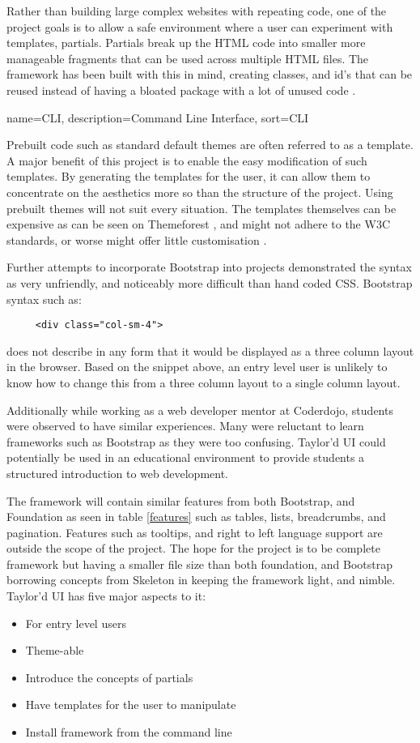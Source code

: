 Rather than building large complex websites with repeating code, one of the project goals is to allow a safe environment where a user can experiment with templates, partials. Partials break up the \gls{HTML} code into smaller more manageable fragments that can be used across multiple \gls{HTML} files. The framework has been built with this in mind, creating classes, and id's that can be reused instead of having a bloated package with a lot of unused code \citep{KAR15}.

{
  name={CLI},
  description={Command Line Interface},
  sort=CLI
}

Prebuilt code such as standard default themes are often referred to as a template. A major benefit of this project is to enable the easy modification of such templates. By generating the templates for the user, it can allow them to concentrate on the aesthetics more so than the structure of the project. Using prebuilt themes will not suit every situation. The templates themselves can be expensive as can be seen on Themeforest \citep{THEME17}, and might not adhere to the W3C standards, or worse might offer little customisation \citep{NATH16}. 

Further attempts to incorporate Bootstrap into projects demonstrated the syntax as very unfriendly, and noticeably more difficult than hand coded \gls{CSS}. Bootstrap syntax such as: \begin{lstlisting}
	 <div class="col-sm-4">\end{lstlisting} 
	 does not describe in any form that it would be displayed as a three column layout in the browser. Based on the snippet above, an entry level user is unlikely to know how to change this from a three column layout to a single column layout. 
	 
Additionally while working as a web developer mentor at Coderdojo, students were observed to have similar experiences. Many were reluctant to learn frameworks such as Bootstrap as they were too confusing. Taylor'd UI could potentially be used in an educational environment to provide students a structured introduction to web development.

The framework will contain similar features from both Bootstrap, and Foundation as seen in table \ref{features} such as tables, lists, breadcrumbs, and pagination. Features such as tooltips, and right to left language support are outside the scope of the project. The hope for the project is to be complete framework but having a smaller file size than both foundation, and Bootstrap borrowing concepts from Skeleton in keeping the framework light, and nimble. Taylor'd UI has five major aspects to it: 
\begin{itemize}
	\item For entry level users
	\item Theme-able
	\item Introduce the concepts of partials
	\item Have templates for the user to manipulate
	\item Install framework from the command line
\end{itemize}
%
\newpage
